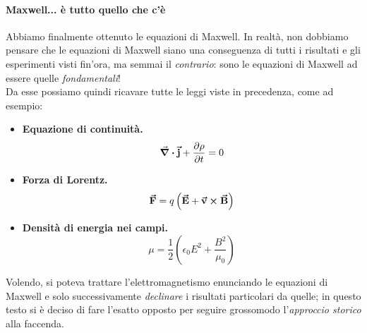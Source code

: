 \paragraph{Maxwell... è tutto quello che c'è}
Abbiamo finalmente ottenuto le equazioni di Maxwell. In realtà, non dobbiamo pensare che le equazioni di Maxwell siano una conseguenza di tutti i risultati e gli esperimenti visti fin'ora, ma semmai il \textit{contrario}: sono le equazioni di Maxwell ad essere quelle \textit{fondamentali}!\\
Da esse possiamo quindi ricavare tutte le leggi viste in precedenza, come ad esempio:
\begin{itemize}
	\item \textbf{Equazione di continuità.}
	\begin{equation}
		\div{\vb*{\va{j}}}+\pdv{\rho}{t}=0
	\end{equation}
	\item \textbf{Forza di Lorentz.}
	\begin{equation}
		\vb*{\va{F}}=q\left(\vb*{\va{E}}+\vb*{\va{v}}\cross\vb*{\va{B}}\right)
	\end{equation}
	\item \textbf{Densità di energia nei campi.}
	\begin{equation}
		\mu=\frac{1}{2}\left(\epsilon_0E^2+\frac{B^2}{\mu_0}\right)
	\end{equation}
\end{itemize}
Volendo, si poteva trattare l'elettromagnetismo enunciando le equazioni di Maxwell e solo successivamente \textit{declinare} i risultati particolari da quelle; in questo testo si è deciso di fare l'esatto opposto per seguire grossomodo l'\textit{approccio storico} alla faccenda.
